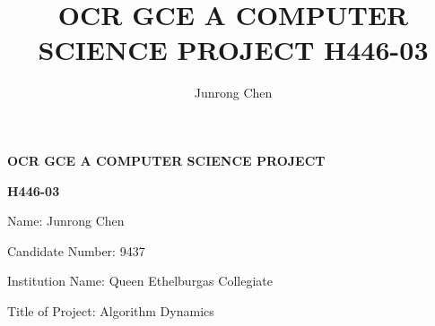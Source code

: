 \documentclass[a4paper]{report}
\title{OCR GCE A COMPUTER SCIENCE PROJECT H446-03}
\author{Junrong Chen}
\begin{document}
\begin{titlepage}
    \begin{center}
        \vspace*{1cm}
        \Huge
        \textbf{OCR GCE A COMPUTER SCIENCE PROJECT}

        \textbf{H446-03}

        \vspace{5cm}
        \large
        Name: Junrong Chen

        Candidate Number: 9437

        Institution Name: Queen Ethelburgas Collegiate

        Title of Project: Algorithm Dynamics
        \vfill

    \end{center}
\end{titlepage}
\tableofcontents
\clearpage







\setcounter{biburlnumpenalty}{9000}
\setcounter{biburllcpenalty}{9000}
\setcounter{biburlucpenalty}{9000}

\printbibliography[
    heading=bibintoc,
    title={Bibliography}
]
\end{document}
